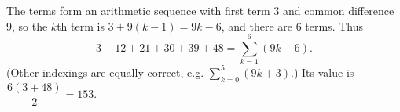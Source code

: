 The terms form an arithmetic sequence with first term $3$ and common difference $9$, so the $k$th term is $3+9(k-1)=9k-6$, and there are $6$ terms. Thus
\[3+12+21+30+39+48=\sum_{k=1}^{6}(9k-6).\]
(Other indexings are equally correct, e.g. $\displaystyle\sum_{k=0}^{5}(9k+3)$.) Its value is $\dfrac{6(3+48)}{2}=\boxed{153}$.
